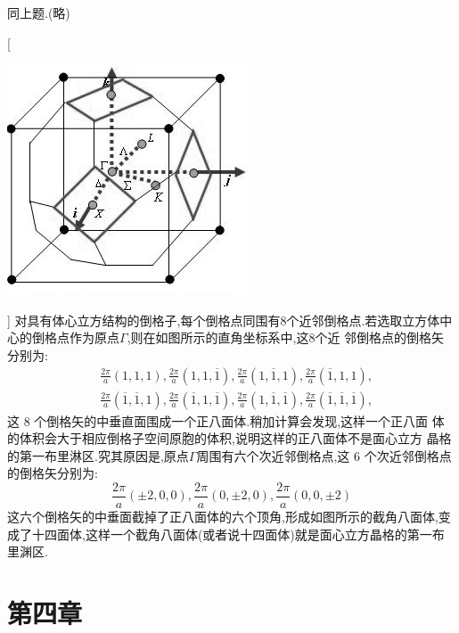 \documentclass[UTF8,10pt,a4paper,oneside]{ctexart}
\begin{document}
    {同上题.(略)}

    [ \begin{center}
        \includegraphics{picture/3-12.png}
    \end{center}]
    {对具有体心立方结构的倒格子,每个倒格点同围有8个近邻倒格点.若选取立方体中心的倒格点作为原点$\Gamma$,则在如图所示的直角坐标系中,这8个近 邻倒格点的倒格矢分别为:
        \[\begin{aligned}
            &\frac{2 \pi}{a}(1,1,1),\frac{2 \pi}{a}(1,1,\overline{1}),\frac{2 \pi}{a}(1,\overline{1},1),\frac{2 \pi}{a}(\overline{1},1,1),\\
            &\frac{2 \pi}{a}(\overline{1},\overline{1},1),\frac{2 \pi}{a}(\overline{1},1,\overline{1}),\frac{2 \pi}{a}(1,\overline{1},\overline{1}),\frac{2 \pi}{a}(\overline{1},\overline{1},\overline{1}),
            \end{aligned}\]这 8 个倒格矢的中垂直面围成一个正八面体.稍加计算会发现,这样一个正八面 体的体积会大于相应倒格子空间原胞的体积,说明这样的正八面体不是面心立方 晶格的第一布里淋区.究其原因是,原点$\Gamma$周围有六个次近邻倒格点,这 6 个次近邻倒格点的倒格矢分别为:
            \[\frac{2 \pi}{a}(\pm 2,0,0),\frac{2 \pi}{a}(0,\pm 2,0),\frac{2 \pi}{a}(0,0,\pm 2)\]这六个倒格矢的中垂面截掉了正八面体的六个顶角,形成如图所示的截角八面体,变成了十四面体,这样一个截角八面体(或者说十四面体)就是面心立方晶格的第一布里渊区.}


\section{第四章}

\end{document}
